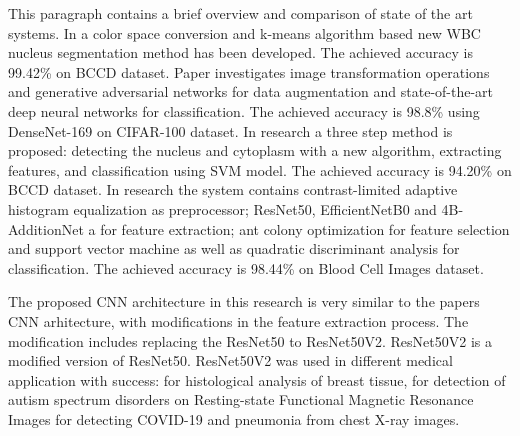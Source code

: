 This paragraph contains a brief overview and comparison of state of the art systems.  
In \cite{b19} a color space conversion and k-means algorithm based new WBC nucleus segmentation method has been developed. The achieved accuracy is 99.42\% on BCCD dataset.
Paper \cite{b20} investigates image transformation operations and generative adversarial networks for data augmentation and state-of-the-art deep neural networks for classification. The achieved accuracy is 98.8\% using DenseNet-169 on CIFAR-100 dataset.
In \cite{b21} research a three step method is proposed: detecting the nucleus and cytoplasm with a new algorithm, extracting features, and classification using SVM model. The achieved accuracy is 94.20\% on BCCD dataset.
In \cite{b5} research the system contains contrast-limited adaptive histogram equalization as preprocessor; ResNet50, EfficientNetB0 and 4B-AdditionNet a for feature extraction; 
ant colony optimization for feature selection and support vector machine as well as quadratic discriminant analysis for classification. The achieved accuracy is 98.44\% on Blood Cell Images dataset.

The proposed CNN architecture in this research is very similar to the \cite{b5} papers CNN arhitecture, with modifications in the feature extraction process. 
The modification includes replacing the ResNet50 to ResNet50V2. ResNet50V2 is a modified version of ResNet50. ResNet50V2 was used in different medical application with success: 
\cite{b22} for histological analysis of breast tissue, \cite{b23} for detection of autism spectrum disorders on Resting-state Functional Magnetic Resonance Images 
\cite{b6} for detecting COVID-19 and pneumonia from chest X-ray images.
